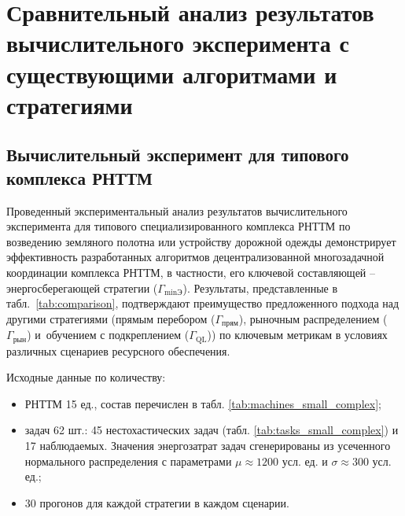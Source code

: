 \section{Сравнительный анализ результатов вычислительного эксперимента с существующими алгоритмами и стратегиями}\label{sec:ch3/sec3}

\subsection{Вычислительный эксперимент для типового комплекса РНТТМ}\label{sec:ch3/sec3sub1}

Проведенный экспериментальный анализ результатов вычислительного эксперимента для типового специализированного комплекса РНТТМ по возведению земляного полотна или устройству дорожной одежды демонстрирует эффективность разработанных алгоритмов децентрализованной многозадачной координации комплекса РНТТМ, в частности, его ключевой составляющей -- энергосберегающей стратегии ($\Gamma_{\min\text{Э}}$). Результаты, представленные в табл.~\ref{tab:comparison}, подтверждают преимущество предложенного подхода над другими стратегиями (прямым перебором ($\Gamma_{\text{прям}}$), рыночным распределением ($\Gamma_{\text{рын}}$) и~обучением с подкреплением ($\Gamma_{\text{QL}}$)) по ключевым метрикам в условиях различных сценариев ресурсного обеспечения.

Исходные данные по количеству:
\begin{itemize}[beginpenalty=10000, midpenalty=10000, wide=\parindent, leftmargin=0pt]
	\item РНТТМ 15 ед., состав перечислен в табл. \ref{tab:machines_small_complex};
	\item задач 62 шт.: 45 нестохастических задач (табл. \ref{tab:tasks_small_complex}) и 17 наблюдаемых. Значения энергозатрат задач сгенерированы из усеченного нормального распределения с параметрами $\mu \approx 1200$ усл. ед. и $\sigma \approx 300$ усл. ед.;
	\item 30 прогонов для каждой стратегии в каждом сценарии.
\end{itemize}

\vspace{\baselineskip}
\begingroup
\small
\renewcommand{\arraystretch}{0.9}
\setlength{\tabcolsep}{3pt}
\setlength{\LTpre}{0pt}
\setlength{\LTpost}{0pt}
\setlength{\extrarowheight}{0pt}
\setlength{\LTleft}{0pt}
\setlength{\LTright}{0pt}


